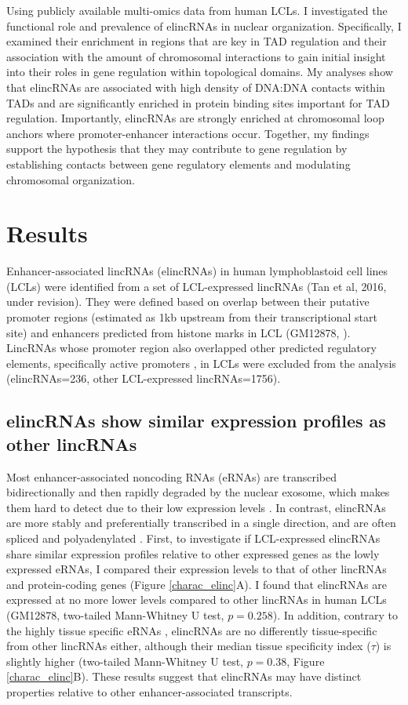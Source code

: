 \documentclass[11pt,a4paper]{report}
\begin{document}
Using publicly available multi-omics data from human LCLs. I investigated the functional role and prevalence of elincRNAs in nuclear organization. Specifically, I examined their enrichment in regions that are key in TAD regulation and their association with the amount of chromosomal interactions to gain initial insight into their roles in gene regulation within topological domains. My analyses show that elincRNAs are associated with high density of DNA:DNA contacts within TADs and are significantly enriched in protein binding sites important for TAD regulation. Importantly, elincRNAs are strongly enriched at chromosomal loop anchors where promoter-enhancer interactions occur. Together, my findings support the hypothesis that they may contribute to gene regulation by establishing contacts between gene regulatory elements and modulating chromosomal organization.

\section*{Results}

Enhancer-associated lincRNAs (elincRNAs) in human lymphoblastoid cell lines (LCLs) were identified from a set of LCL-expressed lincRNAs (Tan et al, 2016, under revision). They were defined based on overlap between their putative promoter regions (estimated as 1kb upstream from their transcriptional start site) and enhancers predicted from histone marks in LCL (GM12878, \cite{ENCODEProject2012}⁠). LincRNAs whose promoter region also overlapped other predicted regulatory elements, specifically active promoters \cite{ENCODEProject2012}⁠, in LCLs were excluded from the analysis (elincRNAs=236, other LCL-expressed lincRNAs=1756).

\subsection*{elincRNAs show similar expression profiles as other lincRNAs}

Most enhancer-associated noncoding RNAs (eRNAs) are transcribed bidirectionally and then rapidly degraded by the nuclear exosome, which makes them hard to detect due to their low expression levels \cite{Darrow2013} \cite{Lam2014}⁠. In contrast, elincRNAs are more stably and preferentially transcribed in a single direction, and are often spliced and polyadenylated \cite{Marques2013a}⁠. 
First, to investigate if LCL-expressed elincRNAs share similar expression profiles relative to other expressed genes as the lowly expressed eRNAs, I compared  their expression levels to that of other lincRNAs and protein-coding genes (Figure \ref{charac_elinc}A). I found that elincRNAs are expressed at no more lower levels compared to other lincRNAs in human LCLs (GM12878, two-tailed Mann-Whitney U test, $p=0.258$). In addition, contrary to the highly tissue specific eRNAs \cite{Wu2014}, elincRNAs are no differently tissue-specific from other lincRNAs either, although their median tissue specificity index ($\tau$) is slightly higher (two-tailed Mann-Whitney U test, $p=0.38$, Figure \ref{charac_elinc}B). These results suggest that elincRNAs may have distinct properties relative to other enhancer-associated transcripts.
\end{document}
